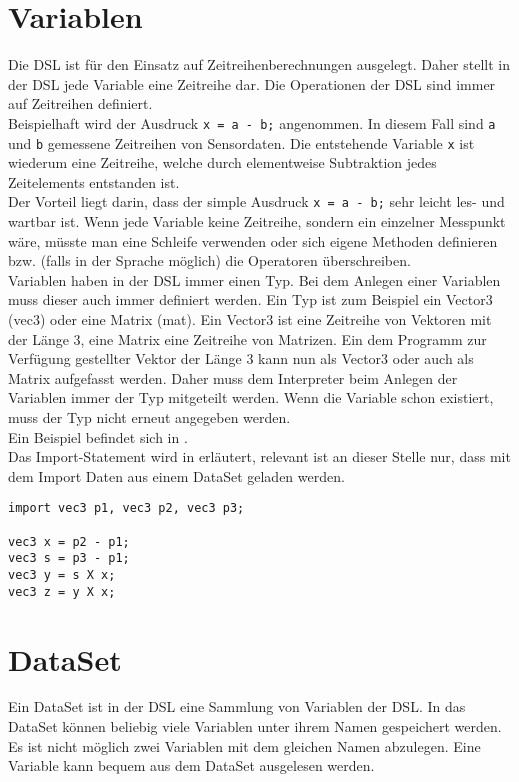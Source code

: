 \section{Variablen}
Die \ac{DSL} ist für den Einsatz auf Zeitreihenberechnungen ausgelegt.
Daher stellt in der \ac{DSL} jede Variable eine Zeitreihe dar.
Die Operationen der \ac{DSL} sind immer auf Zeitreihen definiert.\\
Beispielhaft wird der Ausdruck \texttt{x = a - b;} angenommen.
In diesem Fall sind \texttt{a} und \texttt{b} gemessene Zeitreihen von Sensordaten.
Die entstehende Variable \texttt{x} ist wiederum eine Zeitreihe, welche durch elementweise Subtraktion jedes Zeitelements entstanden ist.\\
Der Vorteil liegt darin, dass der simple Ausdruck \texttt{x = a - b;} sehr leicht les- und wartbar ist.
Wenn jede Variable keine Zeitreihe, sondern ein einzelner Messpunkt wäre, müsste man eine Schleife verwenden oder sich eigene Methoden definieren bzw. (falls in der Sprache möglich) die Operatoren überschreiben.\\
Variablen haben in der \ac{DSL} immer einen Typ.
Bei dem Anlegen einer Variablen muss dieser auch immer definiert werden.
Ein Typ ist zum Beispiel ein Vector3 (vec3) oder eine Matrix (mat).
Ein Vector3 ist eine Zeitreihe von Vektoren mit der Länge 3, eine Matrix eine Zeitreihe von Matrizen.
Ein dem Programm zur Verfügung gestellter Vektor der Länge 3 kann nun als Vector3 oder auch als Matrix aufgefasst werden.
Daher muss dem Interpreter beim Anlegen der Variablen immer der Typ mitgeteilt werden.
Wenn die Variable schon existiert, muss der Typ nicht erneut angegeben werden.\\
Ein Beispiel befindet sich in .\\
Das Import-Statement wird in  erläutert, relevant ist an dieser Stelle nur, dass mit dem Import Daten aus einem DataSet geladen werden.

\begin{lstlisting}[language=prepro, label={lst:Bsp_Variablenzuweisung}, caption={Beispiel Variablenzuweisung}, captionpos=b]
import vec3 p1, vec3 p2, vec3 p3;

vec3 x = p2 - p1;
vec3 s = p3 - p1;
vec3 y = s X x;
vec3 z = y X x;
\end{lstlisting}

\section{DataSet}
Ein DataSet ist in der DSL eine Sammlung von Variablen der \ac{DSL}.
In das DataSet können beliebig viele Variablen unter ihrem Namen gespeichert werden.
Es ist nicht möglich zwei Variablen mit dem gleichen Namen abzulegen.
Eine Variable kann bequem aus dem DataSet ausgelesen werden.

